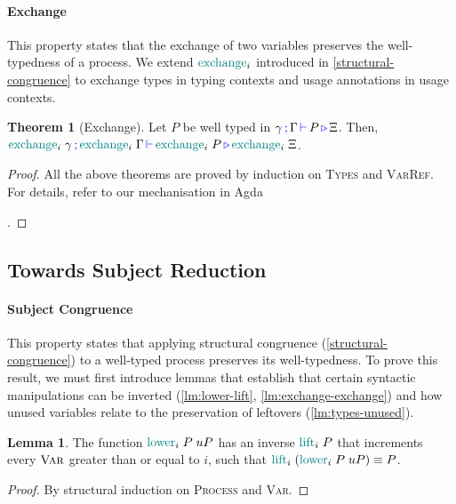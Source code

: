 \documentclass[sigplan,10pt,anonymous,review]{acmart}
\theoremstyle{definition}
\newtheorem{nitheorem}{Theorem}
\newtheorem{nilemma}{Lemma}
\newcommand{\type}[1]{\textcolor{blue}{\operatorname{#1}}}
\newcommand{\func}[1]{\textcolor{teal}{\operatorname{#1}}}
\newcommand{\types}[4]{#1 \, \type{;} \, #2 \, \type{\vdash} \, #3 \, \type{\triangleright} \, #4}
\begin{document}
\paragraph*{Exchange}
This property states that the exchange of two variables preserves the well-typedness of a process.
We extend $\func{exchange}_i$  introduced in \autoref{structural-congruence} to exchange types in typing contexts and usage annotations in usage contexts.
\begin{nitheorem}[Exchange]
  \label{thm:exchange}
  Let $P$ be well typed in $\types{\gamma}{\Gamma}{P}{\Xi}$.
  Then, $\types{\func{exchange}_i \; \gamma}{\func{exchange}_i \; \Gamma}{\allowbreak \func{exchange}_i \; P}{\func{exchange}_i \; \Xi}$.
\end{nitheorem}

\begin{proof}[Proof]
  All the above theorems are proved by induction on \textsc{Types} and \textsc{VarRef}.
  For details, refer to our mechanisation in Agda%
\begin{anonsuppress}
\cite{Zalakain2020Agda}
\end{anonsuppress}
.
\end{proof}

\subsection{Towards Subject Reduction}
\paragraph*{Subject Congruence}
This property states that applying structural congruence (\autoref{structural-congruence}) to a well-typed process preserves its well-typedness.
To prove this result, we must first introduce lemmas that establish that certain syntactic manipulations can be inverted (\autoref{lm:lower-lift}, \autoref{lm:exchange-exchange}) and how unused variables relate to the preservation of leftovers (\autoref{lm:types-unused}).

\begin{nilemma}
  \label{lm:lower-lift}
  The function $\func{lower}_i \; P \; uP$ has an inverse $\func{lift}_i \; P$ that increments every $\textsc{Var}$ greater than or equal to $i$, such that $\func{lift}_i \; (\func{lower}_i \; P \; uP) \equiv P$.
\end{nilemma}
\begin{proof}
  By structural induction on \textsc{Process} and \textsc{Var}.
\end{proof}
\end{document}

